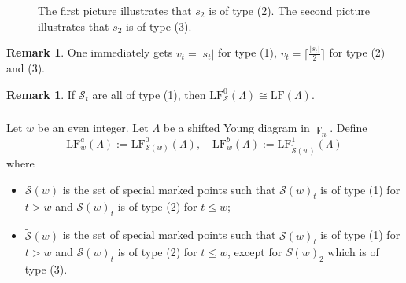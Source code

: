 \documentclass[a4paper]{amsart}
\theoremstyle{plain}
\theoremstyle{definition}
\newtheorem{remark}[theorem]{Remark}
\numberwithin{equation}{section}
\newcommand{\LF}{\mathrm{LF}}
\begin{document}
\begin{figure}[!ht]

    \caption{The first picture illustrates that $s_2$ is of type (2). The second picture illustrates that $s_2$ is of type (3).}
    \label{fig:boundary}
\end{figure}


\begin{remark}
    One immediately gets $v_t = |s_t|$ for type (1), $v_t = \lceil \frac{|s_t|}{2} \rceil$ for type (2) and (3).
\end{remark}
\begin{remark}
    If $\mathcal{S}_t$ are all of type (1), then $\LF^0_{\mathcal{S}}{(\Lambda)}  \cong \LF{(\Lambda)}$.
\end{remark}


\subsubsection{ }		Let $w$ be an even integer. Let $\Lambda$ be a shifted Young diagram in $\digamma_n$. Define
\[
    \mathrm{L}{\mathrm{F}}^{a}_w{(\Lambda)}:=
    \LF_{\mathcal{S}{(w)} }^{0}{(\Lambda)}, \quad \mathrm{L}{\mathrm{F}}^b_w{(\Lambda)}:=  \LF_{\mathcal{\widetilde{S}}{(w)} }^{1}{(\Lambda)}\]
where
\begin{itemize}
    \item [a)] $\mathcal{S}{(w)}$ is the set of special marked points such that  $\mathcal{S}(w)_t$ is of type (1) for $t > w$ and $\mathcal{S}(w)_t$ is of type (2) for $t \leq w$;
    \item [b)] $\mathcal{\widetilde{S}}{(w)}$ is the set of special marked points such that  $\mathcal{S}(w)_t$ is of type (1) for $t > w$ and $\mathcal{S}(w)_t$ is of type (2) for $t \leq w$, except for $S(w)_2$ which is of type (3).
\end{itemize}
\end{document}
